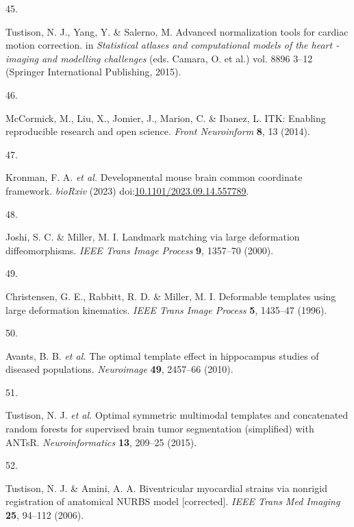 \documentclass[
  12pt,
]{article}
\newlength{\cslhangindent}
\newlength{\csllabelwidth}
\newenvironment{CSLReferences}[2] %
 {%
  \setlength{\parindent}{0pt}
  \ifodd #1 \everypar{\setlength{\hangindent}{\cslhangindent}}\ignorespaces\fi
  \ifnum #2 > 0
  \setlength{\parskip}{#2\baselineskip}
  \fi
 }%
 {}
\newcommand{\CSLLeftMargin}[1]{\parbox[t]{\csllabelwidth}{#1}}
\newcommand{\CSLRightInline}[1]{\parbox[t]{\linewidth - \csllabelwidth}{#1}\break}
\begin{document}
\begin{CSLReferences}{0}{0}
\leavevmode{}%
\CSLLeftMargin{45. }
\CSLRightInline{Tustison, N. J., Yang, Y. \& Salerno, M. Advanced
normalization tools for cardiac motion correction. in \emph{Statistical
atlases and computational models of the heart - imaging and modelling
challenges} (eds. Camara, O. et al.) vol. 8896 3--12 (Springer
International Publishing, 2015).}

\leavevmode{}%
\CSLLeftMargin{46. }
\CSLRightInline{McCormick, M., Liu, X., Jomier, J., Marion, C. \&
Ibanez, L. ITK: Enabling reproducible research and open science.
\emph{Front Neuroinform} \textbf{8}, 13 (2014).}

\leavevmode{}%
\CSLLeftMargin{47. }
\CSLRightInline{Kronman, F. A. \emph{et al.} Developmental mouse brain
common coordinate framework. \emph{bioRxiv} (2023)
doi:\href{https://doi.org/10.1101/2023.09.14.557789}{10.1101/2023.09.14.557789}.}

\leavevmode{}%
\CSLLeftMargin{48. }
\CSLRightInline{Joshi, S. C. \& Miller, M. I. Landmark matching via
large deformation diffeomorphisms. \emph{IEEE Trans Image Process}
\textbf{9}, 1357--70 (2000).}

\leavevmode{}%
\CSLLeftMargin{49. }
\CSLRightInline{Christensen, G. E., Rabbitt, R. D. \& Miller, M. I.
Deformable templates using large deformation kinematics. \emph{IEEE
Trans Image Process} \textbf{5}, 1435--47 (1996).}

\leavevmode{}%
\CSLLeftMargin{50. }
\CSLRightInline{Avants, B. B. \emph{et al.} The optimal template effect
in hippocampus studies of diseased populations. \emph{Neuroimage}
\textbf{49}, 2457--66 (2010).}

\leavevmode{}%
\CSLLeftMargin{51. }
\CSLRightInline{Tustison, N. J. \emph{et al.} Optimal symmetric
multimodal templates and concatenated random forests for supervised
brain tumor segmentation (simplified) with ANTsR.
\emph{Neuroinformatics} \textbf{13}, 209--25 (2015).}

\leavevmode{}%
\CSLLeftMargin{52. }
\CSLRightInline{Tustison, N. J. \& Amini, A. A. Biventricular myocardial
strains via nonrigid registration of anatomical {NURBS} model
{[}corrected{]}. \emph{IEEE Trans Med Imaging} \textbf{25}, 94--112
(2006).}


\end{CSLReferences}
\end{document}
